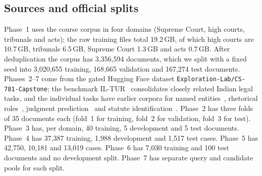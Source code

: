 \documentclass[10pt,a4paper]{article}
\begin{document}
\subsection{Sources and official splits}
Phase~1 uses the course corpus in four domains (Supreme Court, high courts, tribunals and acts); the raw training files total 19.2\,GB, of which high courts are 10.7\,GB, tribunals 6.5\,GB, Supreme Court 1.3\,GB and acts 0.7\,GB. After deduplication the corpus has 3{,}356{,}594 documents, which we split with a fixed seed into 3{,}020{,}655 training, 168{,}665 validation and 167{,}274 test documents. Phases~2--7 come from the gated Hugging Face dataset \texttt{Exploration-Lab/CS-781-Capstone}; the benchmark IL-TUR~\cite{iltur} consolidates closely related Indian legal tasks, and the individual tasks have earlier corpora for named entities~\cite{lner}, rhetorical roles~\cite{rr}, judgment prediction~\cite{ildc} and statute identification~\cite{lesicin}. Phase~2 has three folds of 35 documents each (fold~1 for training, fold~2 for validation, fold~3 for test). Phase~3 has, per domain, 40 training, 5 development and 5 test documents. Phase~4 has 37{,}387 training, 1{,}988 development and 1{,}517 test cases. Phase~5 has 42{,}750, 10{,}181 and 13{,}019 cases. Phase~6 has 7{,}030 training and 100 test documents and no development split. Phase~7 has separate query and candidate pools for each split.
\end{document}
